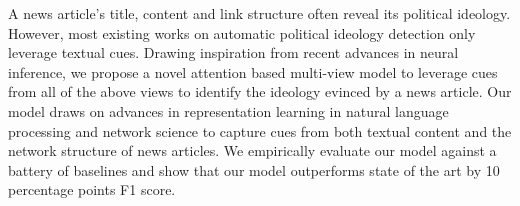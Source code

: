 A news article's title, content and link structure often reveal its political ideology. However, most existing works on automatic political ideology detection only leverage textual cues. Drawing inspiration from recent advances in neural inference, we propose a novel attention based multi-view model to leverage cues from all of the above views to identify the ideology evinced by a news article. Our model draws on advances in representation learning in natural language processing and network science to capture cues from both textual content and the network structure of news articles. We empirically evaluate our model against a battery of baselines and show that our model outperforms state of the art by 10 percentage points F1 score.
